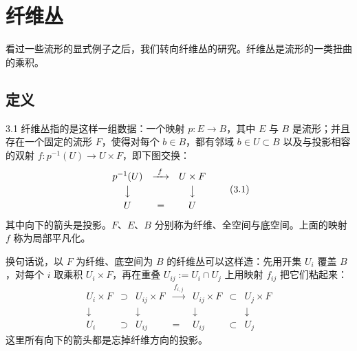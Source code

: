 \chapter{纤维丛}
\setcounter{footnote}{6}

看过一些流形的显式例子之后，我们转向纤维丛的研究。纤维丛是流形的一类扭曲的乘积。

\section{定义}

\begin{definition}{3.1}
纤维丛指的是这样一组数据：一个映射 $p:E\to B$，其中 $E$ 与 $B$ 是流形；并且存在一个固定的流形 $F$，使得对每个 $b\in B$，都有邻域 $b\in U\subset B$ 以及与投影相容的双射 $f:p^{-1}(U)\to U\times F$，即下图交换：
{\small
\[
\begin{array}{ccc}
p^{-1}(U) & \xrightarrow{\ f\ } & U\times F\\[3pt]
\big\downarrow & & \big\downarrow\\[3pt]
U & = & U
\end{array}
\tag{3.1}
\]
}
其中向下的箭头是投影。$F$、$E$、$B$ 分别称为纤维、全空间与底空间。上面的映射 $f$ 称为局部平凡化。
\end{definition}

换句话说，以 $F$ 为纤维、底空间为 $B$ 的纤维丛可以这样造：先用开集 $U_i$ 覆盖 $B$，对每个 $i$ 取乘积 $U_i\times F$，再在重叠 $U_{ij}:=U_i\cap U_j$ 上用映射 $f_{ij}$ 把它们粘起来：
{\small\setlength{\arraycolsep}{4pt}
\[
\begin{array}{ccccccc}
U_i\times F & \supset & U_{ij}\times F & \xrightarrow{\ f_{i,j}\ } & U_{ij}\times F & \subset & U_j\times F\\[3pt]
\downarrow & & \downarrow & & \downarrow & & \downarrow\\[3pt]
U_i & \supset & U_{ij} & = & U_{ij} & \subset & U_j
\end{array}
\tag{3.2}
\]
}
这里所有向下的箭头都是忘掉纤维方向的投影。

